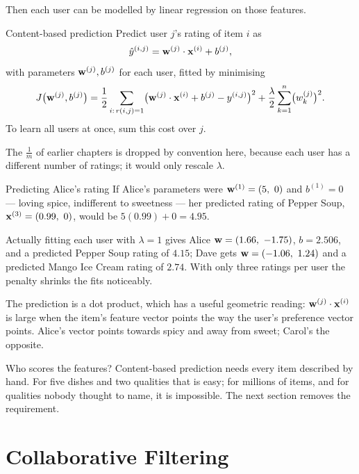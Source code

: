 Then each user can be modelled by linear regression on those features.

\begin{defbox}{Content-based prediction}
Predict user $j$'s rating of item $i$ as
\[
  \hat y^{(i,j)} = \mathbf{w}^{(j)}\cdot\mathbf{x}^{(i)} + b^{(j)},
\]
with parameters $\mathbf{w}^{(j)}, b^{(j)}$ for each user, fitted by minimising
\[
  J\bigl(\mathbf{w}^{(j)}, b^{(j)}\bigr) = \frac12\sum_{i:\,r(i,j)=1}\bigl(\mathbf{w}^{(j)}\cdot\mathbf{x}^{(i)} + b^{(j)} - y^{(i,j)}\bigr)^2
    + \frac{\lambda}{2}\sum_{k=1}^{n}\bigl(w^{(j)}_k\bigr)^2 .
\]
To learn all users at once, sum this cost over $j$.
\end{defbox}

The $\frac1m$ of earlier chapters is dropped by convention here, because each
user has a different number of ratings; it would only rescale $\lambda$.

\begin{workedexample}{Predicting Alice's rating}
If Alice's parameters were $\mathbf{w}^{(1)} = (5,\ 0)$ and $b^{(1)} = 0$ --- loving
spice, indifferent to sweetness --- her predicted rating of Pepper Soup,
$\mathbf{x}^{(3)} = (0.99,\ 0)$, would be $5(0.99) + 0 = 4.95$.

Actually fitting each user with $\lambda = 1$ gives Alice
$\mathbf{w} = (1.66,\ -1.75)$, $b = 2.506$, and a predicted Pepper Soup rating of
$4.15$; Dave gets $\mathbf{w} = (-1.06,\ 1.24)$ and a predicted Mango Ice Cream rating
of $2.74$. With only three ratings per user the penalty shrinks the fits
noticeably.
\end{workedexample}

The prediction is a dot product, which has a useful geometric reading:
$\mathbf{w}^{(j)}\cdot\mathbf{x}^{(i)}$ is large when the item's feature vector points the way
the user's preference vector points. Alice's vector points towards spicy and away
from sweet; Carol's the opposite.

\begin{pitfall}{Who scores the features?}
Content-based prediction needs every item described by hand. For five dishes and
two qualities that is easy; for millions of items, and for qualities nobody
thought to name, it is impossible. The next section removes the requirement.
\end{pitfall}

\section{Collaborative Filtering}
\label{sec:collab}

